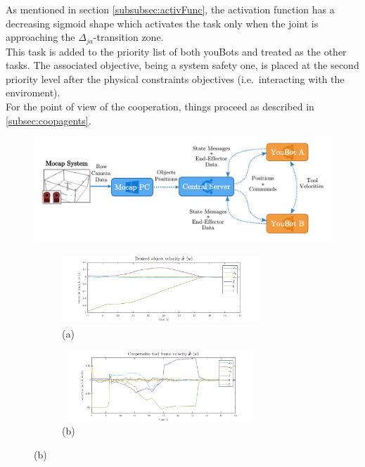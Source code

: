 \documentclass[a4paper, 12pt, notitlepage]{article}
\begin{document}
\begin{multicols}{2}
		\hspace*{7px}As mentioned in section \ref{subsubsec:activFunc}, the activation function has a decreasing sigmoid shape which activates the task only when the joint is approaching the $\Delta_{ja}$-transition zone.\\ 
		This task is added to the priority list of both youBots and treated as the other tasks. The associated objective, being a system safety one, is placed at the second priority level after the physical constraints objectives (i.e.\, interacting with the enviroment). \\
		\hspace*{7px}For the point of view of the cooperation, things proceed as described in \ref{subsec:coopagents}.
		
		\begin{figure}[t!]
			\centering
			\includegraphics[scale=0.32]{systemArch}
			\label{fig:systemArch}
		\end{figure}
		
		\captionsetup[subfigure]{labelformat=empty}
		
		\begin{figure}[b!]
			
			\begin{subfigure}{.5\linewidth}
				\hspace{-30px}
				\includegraphics[width=280px,height=100px]{desiredvel}
				\caption{\hspace{-15px}(a)}
				\label{fig::a}
			\end{subfigure}
			\hfill
			\begin{subfigure}{.5\linewidth}
				\hspace{-10px}
				\includegraphics[width=280px,height=100px]{coopab}
				\caption{\hspace{25px}(b)}
				\label{fig::b}
			\end{subfigure}
	

\end{figure}
\end{multicols}
\end{document}
